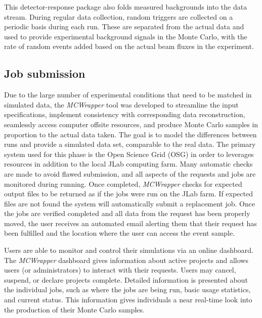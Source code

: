 This detector-response package also folds measured backgrounds into the data stream. During regular data collection, random triggers are collected on a periodic basis during each run. These are separated from the actual data and used to provide experimental background signals in the Monte Carlo, with the rate of random events added based on the actual beam fluxes in the experiment. 

\subsection{Job submission \label{sec:jobsubmission}}
Due to the large number of experimental conditions that need to be matched in simulated data, the \emph{MCWrapper} tool was developed to streamline the input specifications, implement consistency with corresponding data reconstruction, seamlessly access computer offsite resources, and produce Monte Carlo samples in proportion to the actual data taken. The goal is to model the differences between runs and provide a simulated data set, comparable to the real data. The primary system used for this phase is the Open Science Grid (OSG) in order to leverages resources in addition to the local JLab computing farm. Many automatic checks are made to avoid flawed submission, and all aspects of the requests and jobs are monitored during running. Once completed, \emph{MCWrapper} checks for expected output files to be returned as if the jobs were run on the JLab farm. If expected files are not found the system will automatically submit a replacement job. Once the jobs are verified completed and all data from the request has been properly moved, the user receives an automated email alerting them that their request has been fulfilled and the location where the user can access the event sample.

Users are able to monitor and control their simulations via an online dashboard. The \emph{MCWrapper} dashboard gives information about active projects and allows users (or administrators) to interact with their requests. Users may cancel, suspend, or declare projects complete. Detailed information is presented about the individual jobs, such as where the jobs are being run, basic usage statistics, and current status.  This information gives individuals a near real-time look into the production of their Monte Carlo samples.


